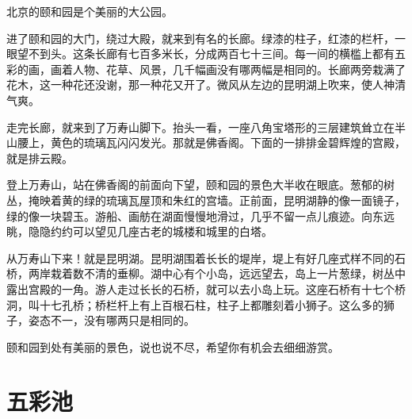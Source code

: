 \documentclass[12pt,UTF-8,openany]{ctexbook}
\begin{document}
\begin{large}
    
    北京的颐和园是个美丽的大公园。
    
    进了颐和园的大门，绕过大殿，就来到有名的长廊。绿漆的柱子，红漆的栏杆，一眼望不到头。这条长廊有七百多米长，分成两百七十三间。每一间的横槛上都有五彩的画，画着人物、花草、风景，几千幅画没有哪两幅是相同的。长廊两旁栽满了花木，这一种花还没谢，那一种花又开了。微风从左边的昆明湖上吹来，使人神清气爽。
    
    走完长廊，就来到了万寿山脚下。抬头一看，一座八角宝塔形的三层建筑耸立在半山腰上，黄色的琉璃瓦闪闪发光。那就是佛香阁。下面的一排排金碧辉煌的宫殿，就是排云殿。
    
    登上万寿山，站在佛香阁的前面向下望，颐和园的景色大半收在眼底。葱郁的树丛，掩映着黄的绿的琉璃瓦屋顶和朱红的宫墙。正前面，昆明湖静的像一面镜子，绿的像一块碧玉。游船、画舫在湖面慢慢地滑过，几乎不留一点儿痕迹。向东远眺，隐隐约约可以望见几座古老的城楼和城里的白塔。
    
    从万寿山下来！就是昆明湖。昆明湖围着长长的堤岸，堤上有好几座式样不同的石桥，两岸栽着数不清的垂柳。湖中心有个小岛，远远望去，岛上一片葱绿，树丛中露出宫殿的一角。游人走过长长的石桥，就可以去小岛上玩。这座石桥有十七个桥洞，叫十七孔桥；桥栏杆上有上百根石柱，柱子上都雕刻着小狮子。这么多的狮子，姿态不一，没有哪两只是相同的。
    
    颐和园到处有美丽的景色，说也说不尽，希望你有机会去细细游赏。
    
\end{large}



\chapter{五彩池}
\end{document}

